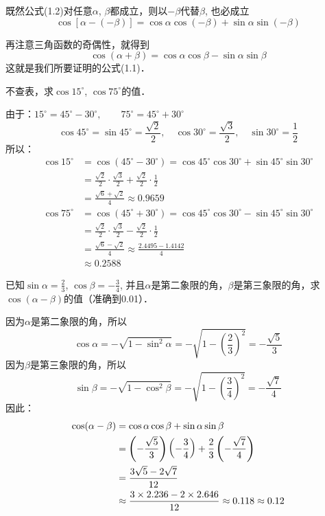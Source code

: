既然公式(1.2)对任意$\alpha$, $\beta$都成立，则以$-\beta$代替$\beta$, 也必成立
    \[ \cos [\alpha-(-\beta)] =\cos\alpha\cos(-\beta)+\sin\alpha\sin(-\beta)\]

再注意三角函数的奇偶性，就得到
\[ \cos(\alpha+\beta) =\cos\alpha\cos\beta-\sin\alpha\sin\beta\]
这就是我们所要证明的公式(1.1)．

\begin{example}
不查表，求$\cos15^{\circ}$, $\cos75^{\circ}$的值．
\end{example}

\begin{solution}
由于：$15^{\circ}=45^{\circ}-30^{\circ},\qquad 75^{\circ}=45^{\circ}+30^{\circ}$
\[\cos 45^{\circ}=\sin 45^{\circ}=\frac{\sqrt{2}}{2},\quad \cos 30^{\circ}=\frac{\sqrt{3}}{2},\quad \sin 30^{\circ}=\frac{1}{2} \]
所以：
\[\begin{split}
\cos15^{\circ}&=\cos(45^{\circ}-30^{\circ})=\cos 45^{\circ}\cos30^{\circ}+\sin 45^{\circ}\sin30^{\circ}\\
&=\frac{\sqrt{2}}{2}\cdot \frac{\sqrt{3}}{2}+\frac{\sqrt{2}}{2}\cdot \frac{1}{2}\\
&=\frac{\sqrt{6}+\sqrt{2}}{4}\approx 0.9659 
\end{split}\]
\[\begin{split}
\cos75^{\circ}&=\cos(45^{\circ}+30^{\circ})=\cos 45^{\circ}\cos30^{\circ}-\sin 45^{\circ}\sin30^{\circ}\\
&=\frac{\sqrt{2}}{2}\cdot \frac{\sqrt{3}}{2}-\frac{\sqrt{2}}{2}\cdot \frac{1}{2}\\
&=\frac{\sqrt{6}-\sqrt{2}}{4}\approx \frac{2.4495-1.4142}{4}\\
&\approx 0.2588 
\end{split}\]
\end{solution}

\begin{example}
    已知$\sin\alpha=\frac{2}{3}$, $\cos\beta=-\frac{3}{4}$, 并且$\alpha$是第二象限的角，$\beta$是第三象限的角，求$\cos(\alpha-\beta)$的值（准确到0.01）．
\end{example}

\begin{solution}
因为$\alpha$是第二象限的角，所以
\[\cos\alpha=-\sqrt{1-\sin^2\alpha}=-\sqrt{1-\left(\frac{2}{3}\right)^2}=-\frac{\sqrt{5}}{3}\]
因为$\beta$是第三象限的角，所以
\[\sin\beta=-\sqrt{1-\cos^2\beta}=-\sqrt{1-\left(\frac{3}{4}\right)^2}=-\frac{\sqrt{7}}{4}\]
因此：
\[\begin{split}
    \cos (\alpha-\beta) &=\cos\alpha\cos\beta+\sin\alpha\sin\beta\\
    &=\left(-\dfrac{\sqrt{5}}{3}\right)\left(-\dfrac{3}{4}\right)+\dfrac{2}{3}\left(-\dfrac{\sqrt{7}}{4}\right)\\
    &=\dfrac{3\sqrt{5}-2\sqrt{7}}{12}\\
    &\approx \dfrac{3\times 2.236-2\times 2.646}{12}\approx 0.118\approx 0.12
\end{split}\]
\end{solution}


